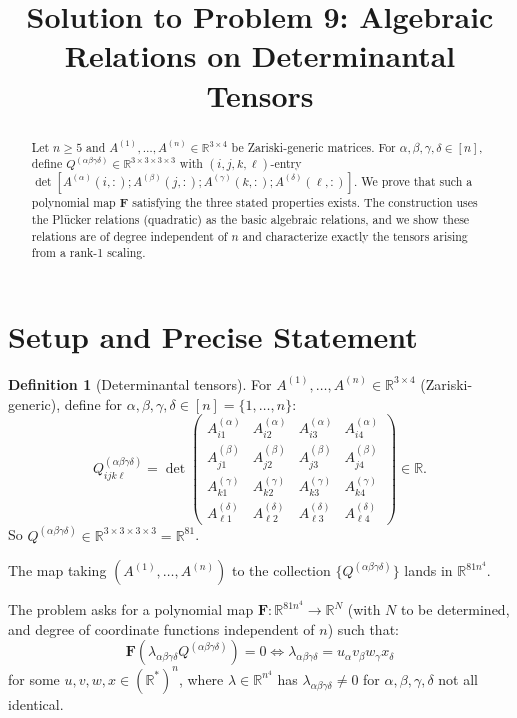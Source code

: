 \documentclass[12pt]{article}
\title{Solution to Problem 9: Algebraic Relations on Determinantal Tensors}
\author{}
\date{}
\theoremstyle{definition}
\newtheorem{definition}{Definition}
\begin{document}
\maketitle

\begin{abstract}
Let $n\geq 5$ and $A^{(1)},\ldots,A^{(n)}\in\mathbb{R}^{3\times 4}$ be Zariski-generic matrices. For $\alpha,\beta,\gamma,\delta\in[n]$, define $Q^{(\alpha\beta\gamma\delta)}\in\mathbb{R}^{3\times 3\times 3\times 3}$ with $(i,j,k,\ell)$-entry $\det[A^{(\alpha)}(i,:);A^{(\beta)}(j,:);A^{(\gamma)}(k,:);A^{(\delta)}(\ell,:)]$. We prove that such a polynomial map $\mathbf{F}$ satisfying the three stated properties exists. The construction uses the Plücker relations (quadratic) as the basic algebraic relations, and we show these relations are of degree independent of $n$ and characterize exactly the tensors arising from a rank-1 scaling.
\end{abstract}

\section{Setup and Precise Statement}

\begin{definition}[Determinantal tensors]
For $A^{(1)},\ldots,A^{(n)}\in\mathbb{R}^{3\times 4}$ (Zariski-generic), define for $\alpha,\beta,\gamma,\delta\in[n] = \{1,\ldots,n\}$:
$$Q^{(\alpha\beta\gamma\delta)}_{ijk\ell} = \det\begin{pmatrix}A^{(\alpha)}_{i1}&A^{(\alpha)}_{i2}&A^{(\alpha)}_{i3}&A^{(\alpha)}_{i4}\\A^{(\beta)}_{j1}&A^{(\beta)}_{j2}&A^{(\beta)}_{j3}&A^{(\beta)}_{j4}\\A^{(\gamma)}_{k1}&A^{(\gamma)}_{k2}&A^{(\gamma)}_{k3}&A^{(\gamma)}_{k4}\\A^{(\delta)}_{\ell 1}&A^{(\delta)}_{\ell 2}&A^{(\delta)}_{\ell 3}&A^{(\delta)}_{\ell 4}\end{pmatrix}\in\mathbb{R}.$$
So $Q^{(\alpha\beta\gamma\delta)}\in\mathbb{R}^{3\times 3\times 3\times 3} = \mathbb{R}^{81}$.
\end{definition}

The map taking $(A^{(1)},\ldots,A^{(n)})$ to the collection $\{Q^{(\alpha\beta\gamma\delta)}\}$ lands in $\mathbb{R}^{81n^4}$.

The problem asks for a polynomial map $\mathbf{F}\colon\mathbb{R}^{81n^4}\to\mathbb{R}^N$ (with $N$ to be determined, and degree of coordinate functions independent of $n$) such that:
$$\mathbf{F}(\lambda_{\alpha\beta\gamma\delta}Q^{(\alpha\beta\gamma\delta)}) = 0 \iff \lambda_{\alpha\beta\gamma\delta} = u_\alpha v_\beta w_\gamma x_\delta$$
for some $u,v,w,x\in(\mathbb{R}^*)^n$, where $\lambda\in\mathbb{R}^{n^4}$ has $\lambda_{\alpha\beta\gamma\delta}\neq 0$ for $\alpha,\beta,\gamma,\delta$ not all identical.
\end{document}
